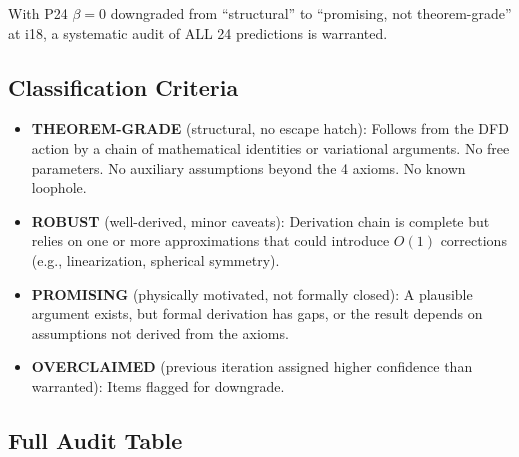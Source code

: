 \documentclass[11pt]{article}
\begin{document}
With P24 $\beta=0$ downgraded from ``structural'' to ``promising, not theorem-grade'' at i18, a systematic audit of ALL 24 predictions is warranted.

\subsection{Classification Criteria}

\begin{itemize}
\item \textbf{THEOREM-GRADE} (structural, no escape hatch): Follows from the DFD action by a chain of mathematical identities or variational arguments. No free parameters. No auxiliary assumptions beyond the 4 axioms. No known loophole.
\item \textbf{ROBUST} (well-derived, minor caveats): Derivation chain is complete but relies on one or more approximations that could introduce $O(1)$ corrections (e.g., linearization, spherical symmetry).
\item \textbf{PROMISING} (physically motivated, not formally closed): A plausible argument exists, but formal derivation has gaps, or the result depends on assumptions not derived from the axioms.
\item \textbf{OVERCLAIMED} (previous iteration assigned higher confidence than warranted): Items flagged for downgrade.
\end{itemize}

\subsection{Full Audit Table}
\end{document}
